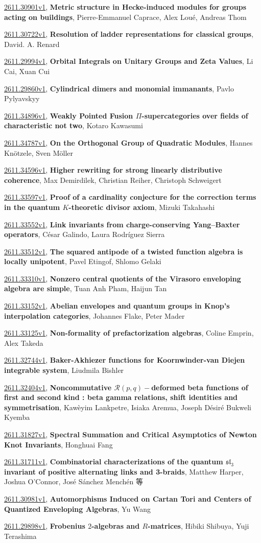 \documentclass[9pt, a4paper]{article}
\theoremstyle{plain}
\theoremstyle{definition}
\theoremstyle{remark}
\newcommand{\arxiv}[3]{\href{https://arxiv.org/abs/#1}{#1}, \textbf{\textcolor{arxivblue}{#2}}, #3}
\begin{document}
\arxiv{2611.30901v1}{Metric structure in Hecke-induced modules for groups acting on buildings}{Pierre-Emmanuel Caprace, Alex Loué, Andreas Thom}

\arxiv{2611.30722v1}{Resolution of ladder representations for classical groups}{David. A. Renard}

\arxiv{2611.29994v1}{Orbital Integrals on Unitary Groups and Zeta Values}{Li Cai, Xuan Cui}

\arxiv{2611.29860v1}{Cylindrical dimers and monomial immanants}{Pavlo Pylyavskyy}

\arxiv{2611.34896v1}{Weakly Pointed Fusion $Π$-supercategories over fields of characteristic not two}{Kotaro Kawasumi}

\arxiv{2611.34787v1}{On the Orthogonal Group of Quadratic Modules}{Hannes Knötzele, Sven Möller}

\arxiv{2611.34596v1}{Higher rewriting for strong linearly distributive coherence}{Max Demirdilek, Christian Reiher, Christoph Schweigert}

\arxiv{2611.33597v1}{Proof of a cardinality conjecture for the correction terms in the quantum $K$-theoretic divisor axiom}{Mizuki Takahashi}

\arxiv{2611.33552v1}{Link invariants from charge-conserving Yang--Baxter operators}{César Galindo, Laura Rodríguez Sierra}

\arxiv{2611.33512v1}{The squared antipode of a twisted function algebra is locally unipotent}{Pavel Etingof, Shlomo Gelaki}

\arxiv{2611.33310v1}{Nonzero central quotients of the Virasoro enveloping algebra are simple}{Tuan Anh Pham, Haijun Tan}

\arxiv{2611.33152v1}{Abelian envelopes and quantum groups in Knop's interpolation categories}{Johannes Flake, Peter Mader}

\arxiv{2611.33125v1}{Non-formality of prefactorization algebras}{Coline Emprin, Alex Takeda}

\arxiv{2611.32744v1}{Baker-Akhiezer functions for Koornwinder-van Diejen integrable system}{Liudmila Bishler}

\arxiv{2611.32404v1}{Noncommutative $\mathcal{R}(p,q)-$deformed beta functions of first and second kind : beta gamma relations, shift identities and symmetrisation}{Kawèyim Lankpetre, Isiaka Aremua, Joseph Désiré Bukweli Kyemba}

\arxiv{2611.31827v1}{Spectral Summation and Critical Asymptotics of Newton Knot Invariants}{Honghuai Fang}

\arxiv{2611.31711v1}{Combinatorial characterizations of the quantum $\mathfrak{sl}_3$ invariant of positive alternating links and 3-braids}{Matthew Harper, Joshua O'Connor, José Sánchez Menchén 等}

\arxiv{2611.30981v1}{Automorphisms Induced on Cartan Tori and Centers of Quantized Enveloping Algebras}{Yu Wang}

\arxiv{2611.29898v1}{Frobenius $2$-algebras and $R$-matrices}{Hibiki Shibuya, Yuji Terashima}

\end{document}
